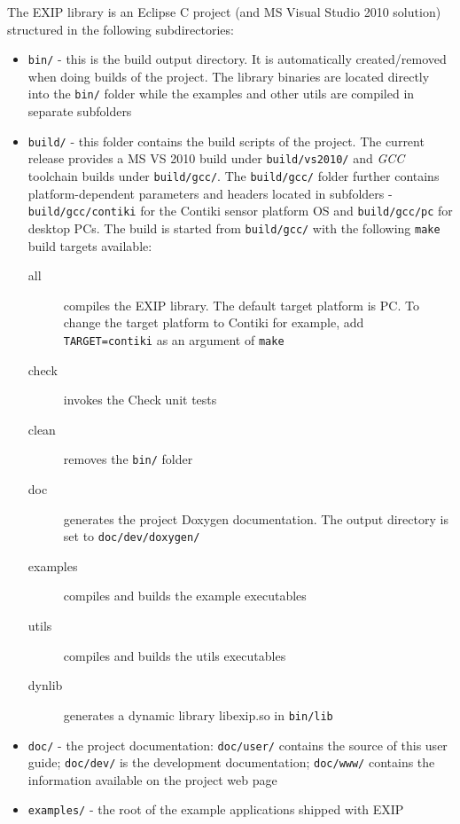 The EXIP library is an Eclipse C project (and MS Visual Studio 2010 solution)
structured in the following subdirectories:
\begin{itemize}
 \item \texttt{bin/} - this is the build output directory. It is automatically created/removed when
doing builds of the project. The library binaries are located directly into the \texttt{bin/} folder
while the examples and other utils are compiled in separate subfolders

 \item \texttt{build/} - this folder contains the build scripts of the project. The current release
provides a MS VS 2010 build under \texttt{build/vs2010/} and \emph{GCC} toolchain builds under \texttt{build/gcc/}.
The \texttt{build/gcc/} folder further contains platform-dependent parameters and
headers located in subfolders - \texttt{build/gcc/contiki} for the Contiki sensor platform OS and
\texttt{build/gcc/pc} for desktop PCs. The build is started from \texttt{build/gcc/} with the following
\texttt{make} build targets available:
\begin{description}
 \item[all] compiles the EXIP library. The default target platform is PC. To change the target
platform to Contiki for example, add \texttt{TARGET=contiki} as an argument of \texttt{make}
 \item[check] invokes the Check unit tests
 \item[clean] removes the \texttt{bin/} folder
 \item[doc] generates the project Doxygen documentation. The output directory is set to \texttt{doc/dev/doxygen/}
 \item[examples] compiles and builds the example executables
 \item[utils] compiles and builds the utils executables
 \item[dynlib] generates a dynamic library libexip.so in \texttt{bin/lib}
 \end{description}

 \item \texttt{doc/} - the project documentation: \texttt{doc/user/} contains the source of this user guide;
    \texttt{doc/dev/} is the development documentation; 
  \texttt{doc/www/} contains the information available on the project web page

 \item \texttt{examples/} - the root of the example applications shipped with EXIP


\end{itemize}

